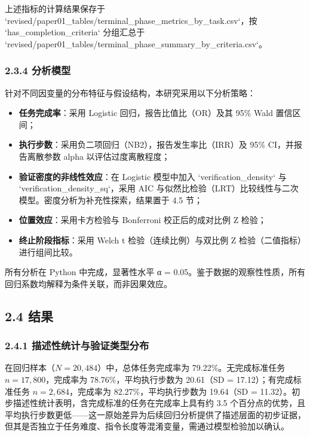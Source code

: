 \documentclass[12pt,a4paper,openany,oneside]{ctexrep}
\begin{document}
上述指标的计算结果保存于 `revised/paper01\_tables/terminal\_phase\_metrics\_by\_task.csv`，按 `has\_completion\_criteria` 分组汇总于 `revised/paper01\_tables/terminal\_phase\_summary\_by\_criteria.csv`。

\subsubsection{2.3.4 分析模型}


针对不同因变量的分布特征与假设结构，本研究采用以下分析策略：

\begin{itemize}
\item \textbf{任务完成率}：采用 Logistic 回归，报告比值比（OR）及其 95\% Wald 置信区间；
\item \textbf{执行步数}：采用负二项回归（NB2），报告发生率比（IRR）及 95\% CI，并报告离散参数 alpha 以评估过度离散程度；
\item \textbf{验证密度的非线性效应}：在 Logistic 模型中加入 `verification\_density` 与 `verification\_density\_sq`，采用 AIC 与似然比检验（LRT）比较线性与二次模型。密度分析为补充性探索，结果置于 4.5 节；
\item \textbf{位置效应}：采用卡方检验与 Bonferroni 校正后的成对比例 Z 检验；
\item \textbf{终止阶段指标}：采用 Welch t 检验（连续比例）与双比例 Z 检验（二值指标）进行组间比较。
\end{itemize}


所有分析在 Python 中完成，显著性水平 α = 0.05。鉴于数据的观察性性质，所有回归系数均解释为条件关联，而非因果效应。

\subsection{2.4 结果}


\subsubsection{2.4.1 描述性统计与验证类型分布}


在回归样本（$N=20{,}484$）中，总体任务完成率为 79.22\%。无完成标准任务 $n=17{,}800$，完成率为 78.76\%，平均执行步数为 20.61（SD = 17.12）；有完成标准任务 $n=2{,}684$，完成率为 82.27\%，平均执行步数为 19.64（SD = 11.32）。初步描述性统计表明，含完成标准的任务在完成率上具有约 3.5 个百分点的优势，且平均执行步数更低——这一原始差异为后续回归分析提供了描述层面的初步证据，但其是否独立于任务难度、指令长度等混淆变量，需通过模型检验加以确认。
\end{document}

